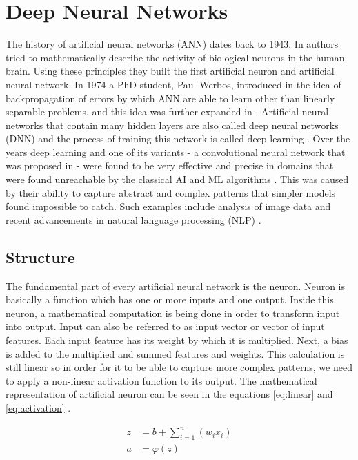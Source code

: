 \chapter{Deep Neural Networks}

The history of artificial neural networks (ANN) dates back to 1943. In \cite{McCulloch1943} authors tried to mathematically describe the activity of biological neurons in the human brain. Using these principles they built the first artificial neuron and artificial neural network. In 1974 a PhD student, Paul Werbos, introduced in \cite{Werbos1974} the idea of backpropagation of errors by which ANN are able to learn other than linearly separable problems, and this idea was further expanded in \cite{Rumelhart1986}. Artificial neural networks that contain many hidden layers are also called deep neural networks (DNN) and the process of training this network is called deep learning \cite{LeCun2015}. Over the years deep learning and one of its variants - a convolutional neural network that was proposed in \cite{LeCun2015-2} - were found to be very effective and precise in domains that were found unreachable by the classical AI and ML algorithms \cite{LeCun2015}. This was caused by their ability to capture abstract and complex patterns that simpler models found impossible to catch. Such examples include analysis of image data \cite{Farabet2013, Alzubaidi2021} and recent advancements in natural language processing (NLP) \cite{Deng2018}.

\section{Structure}
The fundamental part of every artificial neural network is the neuron. Neuron is basically a function which has one or more inputs and one output. Inside this neuron, a mathematical computation is being done in order to transform input into output. Input can also be referred to as input vector or vector of input features. Each input feature has its weight by which it is multiplied. Next, a bias is added to the multiplied and summed features and weights. This calculation is still linear so in order for it to be able to capture more complex patterns, we need to apply a non-linear activation function to its output. The mathematical representation of artificial neuron can be seen in the equations \ref{eq:linear} and \ref{eq:activation} \cite{Goodfellow2016}.

\begin{align}
\label{eq:linear}
    z &= b + \sum_{i=1}^n (w_i x_i) \\
\label{eq:activation}
    a &= \varphi(z)
\end{align}

